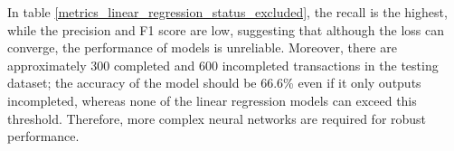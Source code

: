 \documentclass[12pt,twoside]{report}
\begin{document}
In table \ref{metrics_linear_regression_status_excluded}, the recall is the highest, while the precision and F1 score are low, suggesting that although the loss can converge, the performance of models is unreliable.  Moreover, there are approximately 300 completed and 600 incompleted transactions in the testing dataset; the accuracy of the model should be 66.6\% even if it only outputs incompleted, whereas none of the linear regression models can exceed this threshold. Therefore, more complex neural networks are required for robust performance. 
\\

\begin{figure}[!htbp]
	\centering
	\hfill
	\hfill
	\hfil

\end{figure}
\end{document}
